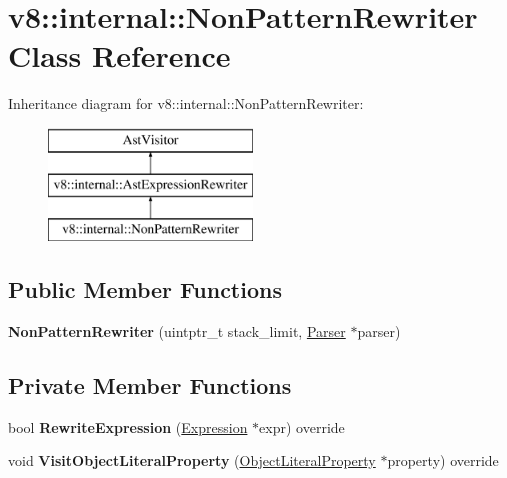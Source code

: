 \hypertarget{classv8_1_1internal_1_1_non_pattern_rewriter}{}\section{v8\+:\+:internal\+:\+:Non\+Pattern\+Rewriter Class Reference}
\label{classv8_1_1internal_1_1_non_pattern_rewriter}
Inheritance diagram for v8\+:\+:internal\+:\+:Non\+Pattern\+Rewriter\+:\begin{figure}[H]
\begin{center}
\leavevmode
\includegraphics[height=3.000000cm]{classv8_1_1internal_1_1_non_pattern_rewriter}
\end{center}
\end{figure}
\subsection*{Public Member Functions}
\begin{DoxyCompactItemize}
\item 
{\bfseries Non\+Pattern\+Rewriter} (uintptr\+\_\+t stack\+\_\+limit, \hyperlink{classv8_1_1internal_1_1_parser}{Parser} $\ast$parser)\hypertarget{classv8_1_1internal_1_1_non_pattern_rewriter_a065783f6100f69c9dc16f743fffaf674}{}\label{classv8_1_1internal_1_1_non_pattern_rewriter_a065783f6100f69c9dc16f743fffaf674}

\end{DoxyCompactItemize}
\subsection*{Private Member Functions}
\begin{DoxyCompactItemize}
\item 
bool {\bfseries Rewrite\+Expression} (\hyperlink{classv8_1_1internal_1_1_expression}{Expression} $\ast$expr) override\hypertarget{classv8_1_1internal_1_1_non_pattern_rewriter_afbf55e5cba6868afbc74762f5a4d7d2a}{}\label{classv8_1_1internal_1_1_non_pattern_rewriter_afbf55e5cba6868afbc74762f5a4d7d2a}

\item 
void {\bfseries Visit\+Object\+Literal\+Property} (\hyperlink{classv8_1_1internal_1_1_object_literal_property}{Object\+Literal\+Property} $\ast$property) override\hypertarget{classv8_1_1internal_1_1_non_pattern_rewriter_a049f8e1d5a48039ad992c54c28226ab4}{}\label{classv8_1_1internal_1_1_non_pattern_rewriter_a049f8e1d5a48039ad992c54c28226ab4}

\end{DoxyCompactItemize}
